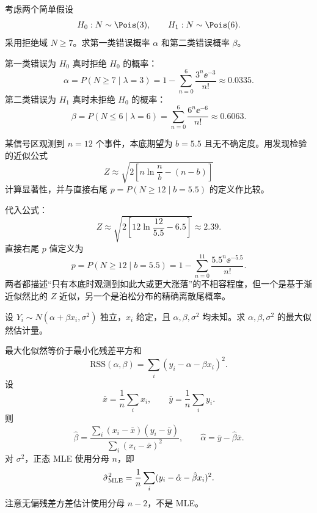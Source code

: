 \begin{question}
考虑两个简单假设
\[
H_0:N\sim\Pois(3),
\qquad
H_1:N\sim\Pois(6).
\]
采用拒绝域 $N\ge7$。求第一类错误概率 $\alpha$ 和第二类错误概率 $\beta$。
\begin{solution}
第一类错误为 $H_0$ 真时拒绝 $H_0$ 的概率：
\[
\alpha=P(N\ge7\mid\lambda=3)
=1-\sum_{n=0}^{6}\frac{3^n\ee^{-3}}{n!}
\approx0.0335.
\]
第二类错误为 $H_1$ 真时未拒绝 $H_0$ 的概率：
\[
\beta=P(N\le6\mid\lambda=6)
=\sum_{n=0}^{6}\frac{6^n\ee^{-6}}{n!}
\approx0.6063.
\]
\end{solution}
\end{question}

\begin{question}
某信号区观测到 $n=12$ 个事件，本底期望为 $b=5.5$ 且无不确定度。用发现检验的近似公式
\[
Z\approx\sqrt{2\left[n\ln\frac n b-(n-b)\right]}
\]
计算显著性，并与直接右尾 $p=P(N\ge12\mid b=5.5)$ 的定义作比较。
\begin{solution}
代入公式：
\[
Z\approx\sqrt{2\left[12\ln\frac{12}{5.5}-6.5\right]}
\approx2.39.
\]
直接右尾 $p$ 值定义为
\[
p=P(N\ge12\mid b=5.5)=1-\sum_{n=0}^{11}\frac{5.5^n\ee^{-5.5}}{n!}.
\]
两者都描述“只有本底时观测到如此大或更大涨落”的不相容程度，但一个是基于渐近似然比的 $Z$ 近似，另一个是泊松分布的精确离散尾概率。
\end{solution}
\end{question}

\begin{question}
设 $Y_i\sim N(\alpha+\beta x_i,\sigma^2)$ 独立，$x_i$ 给定，且 $\alpha,\beta,\sigma^2$ 均未知。求 $\alpha,\beta,\sigma^2$ 的最大似然估计量。
\begin{solution}
最大化似然等价于最小化残差平方和
\[
\mathrm{RSS}(\alpha,\beta)=\sum_i(y_i-\alpha-\beta x_i)^2.
\]
设
\[
\bar x=\frac1n\sum_ix_i,
\qquad
\bar y=\frac1n\sum_iy_i.
\]
则
\[
\hat\beta=\frac{\sum_i(x_i-\bar x)(y_i-\bar y)}{\sum_i(x_i-\bar x)^2},
\qquad
\hat\alpha=\bar y-\hat\beta\bar x.
\]
对 $\sigma^2$，正态 MLE 使用分母 $n$，即
\[
\hat\sigma^2_{\rm MLE}=\frac1n\sum_i(y_i-\hat\alpha-\hat\beta x_i)^2.
\]
注意无偏残差方差估计使用分母 $n-2$，不是 MLE。
\end{solution}
\end{question}

